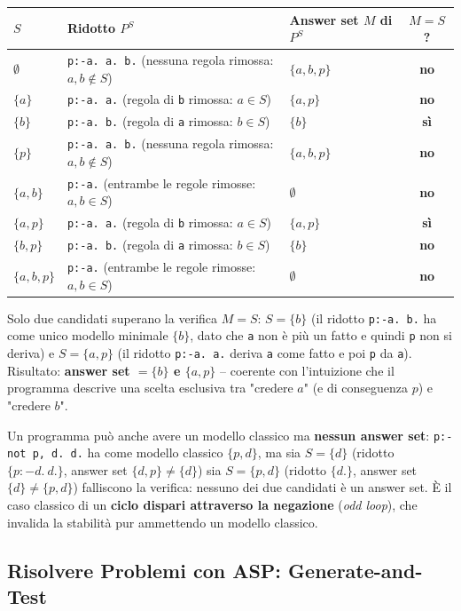 \documentclass[a4paper,11pt]{article}
\begin{document}
\begin{center}
\small
\begin{tabular}{lp{4.3cm}p{2.6cm}c}
\toprule
$S$ & Ridotto $P^S$ & Answer set $M$ di $P^S$ & $M=S$? \\
\midrule
$\emptyset$ & \texttt{p:-a. a. b.} (nessuna regola rimossa: $a,b\notin S$) & $\{a,b,p\}$ & \textbf{no} \\
$\{a\}$ & \texttt{p:-a. a.} (regola di \texttt{b} rimossa: $a\in S$) & $\{a,p\}$ & \textbf{no} \\
$\{b\}$ & \texttt{p:-a. b.} (regola di \texttt{a} rimossa: $b\in S$) & $\{b\}$ & \textbf{sì} \\
$\{p\}$ & \texttt{p:-a. a. b.} (nessuna regola rimossa: $a,b\notin S$) & $\{a,b,p\}$ & \textbf{no} \\
$\{a,b\}$ & \texttt{p:-a.} (entrambe le regole rimosse: $a,b\in S$) & $\emptyset$ & \textbf{no} \\
$\{a,p\}$ & \texttt{p:-a. a.} (regola di \texttt{b} rimossa: $a\in S$) & $\{a,p\}$ & \textbf{sì} \\
$\{b,p\}$ & \texttt{p:-a. b.} (regola di \texttt{a} rimossa: $b\in S$) & $\{b\}$ & \textbf{no} \\
$\{a,b,p\}$ & \texttt{p:-a.} (entrambe le regole rimosse: $a,b\in S$) & $\emptyset$ & \textbf{no} \\
\bottomrule
\end{tabular}
\end{center}
Solo due candidati superano la verifica $M=S$: $S=\{b\}$ (il ridotto \texttt{p:-a. b.} ha come unico modello minimale $\{b\}$, dato che \texttt{a} non è più un fatto e quindi \texttt{p} non si deriva) e $S=\{a,p\}$ (il ridotto \texttt{p:-a. a.} deriva \texttt{a} come fatto e poi \texttt{p} da \texttt{a}). Risultato: \textbf{answer set $=\{b\}$ e $\{a,p\}$} -- coerente con l'intuizione che il programma descrive una scelta esclusiva tra "credere $a$" (e di conseguenza $p$) e "credere $b$".

Un programma può anche avere un modello classico ma \textbf{nessun answer set}: \texttt{p:-not p, d. d.} ha come modello classico $\{p,d\}$, ma sia $S=\{d\}$ (ridotto $\{p{:-}d.\ d.\}$, answer set $\{d,p\}\neq\{d\}$) sia $S=\{p,d\}$ (ridotto $\{d.\}$, answer set $\{d\}\neq\{p,d\}$) falliscono la verifica: nessuno dei due candidati è un answer set. È il caso classico di un \textbf{ciclo dispari attraverso la negazione} (\emph{odd loop}), che invalida la stabilità pur ammettendo un modello classico.

\subsection{Risolvere Problemi con ASP: Generate-and-Test}
\end{document}
